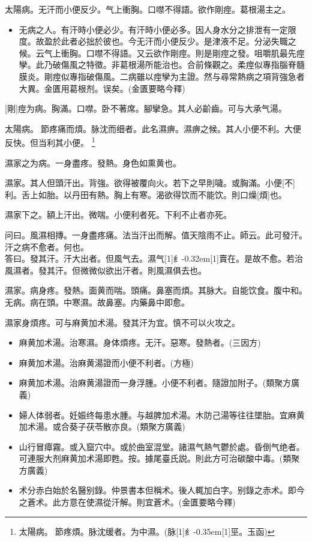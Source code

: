 \documentclass[11pt,oneside,b5paper]{ctexbook}
\begin{document}
\begin{flushleft}
太陽病。无汗而小便反少。气上衝胸。口噤不得語。欲作剛痙。葛根湯主之。

\begin{itemize}
\item 无病之人。有汗時小便必少。有汗時小便必多。因人身水分之排泄有一定限度。故盈於此者必拙於彼也。今无汗而小便反少。是津液不足。分泌失職之候。云气上衝胸。口噤不得語。又云欲作剛痙。則是剛痙之發。咀嚼肌最先痙孿。此乃破傷風之特徵。非葛根湯所能治也。合前條觀之。柔痙似專指腦脊髓膜炎。剛痙似專指破傷風。二病雖以痙孿为主證。然与尋常熱病之項背強急者大異。金匱用葛根剂。误矣。(金匱要略今釋)
\end{itemize}

[剛]痙为病。胸滿。口噤。卧不著席。腳攣急。其人必齘齒。可与大承气湯。

太陽病。{𬮦}節疼痛而煩。脉沈而细者。此名濕痹。濕痹之候。其人小便不利。大便反快。但当利其小便。
\footnote{太陽病。{𬮦}節疼煩。脉沈缓者。为中濕。(脉{\hbox{\scalebox{0.68}[1]{纟}\kern-0.35em\scalebox{0.64}[1]{巠}}}。玉函)}

濕家之为病。一身盡疼。發熱。身色如熏黄也。

濕家。其人但頭汗出。背強。欲得被覆向火。若下之早則噦。或胸滿。小便[不]利。舌上如胎。以丹田有熱。胸上有寒。渴欲得饮而不能饮。則口燥[煩]也。

濕家下之。額上汗出。微喘。小便利者死。下利不止者亦死。

问曰。風濕相摶。一身盡疼痛。法当汗出而解。值天陰雨不止。師云。此可發汗。汗之病不愈者。何也。\\
答曰。發其汗。汗大出者。但風气去。濕气{\hbox{\scalebox{0.6}[1]{纟}\kern-0.32em\scalebox{0.7}[1]{賣}}}在。是故不愈。若治風濕者。發其汗。但微微似欲出汗者。則風濕俱去也。

濕家。病身疼。發熱。面黄而喘。頭痛。鼻塞而煩。其脉大。自能饮食。腹中和。无病。病在頭。中寒濕。故鼻塞。内藥鼻中即愈。

濕家身煩疼。可与麻黄加术湯。發其汗为宜。慎不可以火攻之。

\begin{itemize}
\item 麻黄加术湯。治寒濕。身体煩疼。无汗。惡寒。發熱者。(三因方)
\item 麻黄加术湯。治麻黄湯證而小便不利者。(方極)
\item 麻黄加术湯。治麻黄湯證而一身浮腫。小便不利者。隨證加附子。(類聚方廣義)
\item 婦人体弱者。妊娠终每患水腫。与越脾加术湯。木防己湯等往往墜胎。宜麻黄加术湯。或合葵子茯苓散亦良。(類聚方廣義)
\item 山行冒瘴霧。或入窟穴中。或於曲室混堂。諸濕气熱气鬱於處。昏倒气绝者。可連服大剂麻黄加术湯即甦。按。據尾臺氏説。則此方可治碳酸中毒。(類聚方廣義)
\item 术分赤白始於名醫别錄。仲景書本但稱术。後人輒加白字。别錄之赤术。即今之蒼术。此方意在使濕從汗解。則宜蒼术。(金匱要略今釋)
\end{itemize}


\end{flushleft}
\end{document}
